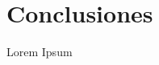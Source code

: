 \centering
\thispagestyle{fancy}
\fancyfoot{}
\fancyhead{}
\renewcommand{\headrulewidth}{0pt}
\vspace*{\fill}
\section*{Conclusiones}
\justify
\noindent
Lorem Ipsum

\vspace*{\fill}
\newpage